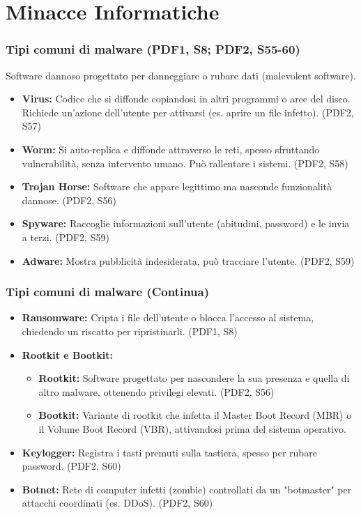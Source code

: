 \documentclass{beamer}
\begin{document}
\section{Minacce Informatiche}

\begin{frame}
  \frametitle{Tipi comuni di malware (PDF1, S8; PDF2, S55-60)}
  Software dannoso progettato per danneggiare o rubare dati (malevolent software).
  \begin{itemize}
    \item \textbf{Virus:} Codice che si diffonde copiandosi in altri programmi o aree del disco. Richiede un'azione dell'utente per attivarsi (es. aprire un file infetto). (PDF2, S57)
    \item \textbf{Worm:} Si auto-replica e diffonde attraverso le reti, spesso sfruttando vulnerabilità, senza intervento umano. Può rallentare i sistemi. (PDF2, S58)
    \item \textbf{Trojan Horse:} Software che appare legittimo ma nasconde funzionalità dannose. (PDF2, S56)
    \item \textbf{Spyware:} Raccoglie informazioni sull'utente (abitudini, password) e le invia a terzi. (PDF2, S59)
    \item \textbf{Adware:} Mostra pubblicità indesiderata, può tracciare l'utente. (PDF2, S59)
  \end{itemize}
\end{frame}

\begin{frame}
  \frametitle{Tipi comuni di malware (Continua)}
  \begin{itemize}
    \item \textbf{Ransomware:} Cripta i file dell'utente o blocca l'accesso al sistema, chiedendo un riscatto per ripristinarli. (PDF1, S8)
    \item \textbf{Rootkit e Bootkit:}
    \begin{itemize}
        \item \textbf{Rootkit:} Software progettato per nascondere la sua presenza e quella di altro malware, ottenendo privilegi elevati. (PDF2, S56)
        \item \textbf{Bootkit:} Variante di rootkit che infetta il Master Boot Record (MBR) o il Volume Boot Record (VBR), attivandosi prima del sistema operativo.
    \end{itemize}
     \item \textbf{Keylogger:} Registra i tasti premuti sulla tastiera, spesso per rubare password. (PDF2, S60)
     \item \textbf{Botnet:} Rete di computer infetti (zombie) controllati da un "botmaster" per attacchi coordinati (es. DDoS). (PDF2, S60)
  \end{itemize}
\end{frame}
\end{document}
